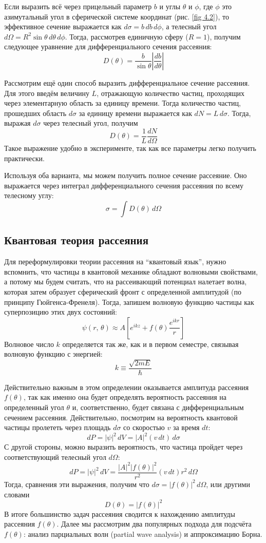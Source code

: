 Если выразить всё через прицельный параметр $b$ и углы $\theta$ и $\phi$, где
$\phi$ это азимутальный угол в сферической системе координат (рис. \ref{fig
  4.2}), то эффективное сечение выражается как $d\sigma = b\,db\,d\phi$, а
телесный угол $d\Omega = R^2\sin\theta\,d\theta\,d\phi$. Тогда, рассмотрев
единичную сферу ($R=1$), получим следующее уравнение для дифференциального
сечения рассеяния:
\[
  D(\theta) = \frac{b}{\sin \theta}\left|\frac{db}{d\theta}\right|
\]

Рассмотрим ещё один способ выразить дифференциальное сечение рассеяния. Для
этого введём величину $L$, отражающую количество частиц, проходящих через
элементарную область за единицу времени. Тогда количество частиц, прошедших
область $d\sigma$ за единицу времени выражается как $dN=L\,d\sigma$. Тогда,
выражая $d\sigma$ через телесный угол, получим
\[
  D(\theta) = \frac{1}{L}\frac{dN}{d\Omega}
\]
Такое выражение удобно в эксперименте, так как все параметры легко получить
практически.

Используя оба варианта, мы можем получить полное сечение рассеяние. Оно
выражается через интеграл дифференциального сечения рассеяния по всему
телесному углу:
\[
  \sigma = \int D(\theta)\,d\Omega
\]

\subsection{Квантовая теория рассеяния}
Для переформулировки теории рассеяния на ``квантовый язык'', нужно вспомнить,
что частицы в квантовой механике обладают волновыми свойствами, а потому мы
будем считать, что на рассеивающий потенциал налетает волна, которая затем
образует сферический фронт с определенной амплитудой (по принципу
Гюйгенса-Френеля). Тогда, запишем волновую функцию частицы как суперпозицию
этих двух состояний:
\[
  \psi(r,\,\theta)\approx A\left[e^{ikz} + f(\theta)\frac{e^{ikr}}{r}\right]
\]
Волновое число $k$ определяется так же, как и в первом семестре, связывая
волновую функцию с энергией:
\[
  k \equiv \frac{\sqrt{2mE}}{\hbar}
\]

Действительно важным в этом определении оказывается амплитуда рассеяния
$f(\theta)$, так как именно она будет определять вероятность рассеяния на
определенный угол $\theta$ и, соответственно, будет связана с дифференциальным
сечением рассеяния. Действительно, посмотрим на вероятность квантовой частицы
пролететь через площадь $d\sigma$ со скоростью $v$ за время $dt$:
\[
  dP = |\psi|^2\, dV = |A|^2(v\, dt)\,d\sigma
\]
С другой стороны, можно выразить вероятность, что частица пройдет через
соответствующий телесный угол $d\Omega$:
\[
  dP = |\psi|^2\,dV = \frac{|A|^2|f(\theta)|^2}{r^2}(v\,dt)r^2\,d\Omega
\]
Тогда, сравнения эти выражения, получим что $d\sigma = |f(\theta)|^2\,d\Omega$,
или другими словами
\[
  D(\theta) = |f(\theta)|^2
\]
В итоге большинство задач рассеяния сводится к нахождению амплитуды рассеяния
$f(\theta)$. Далее мы рассмотрим два популярных подхода для подсчёта
$f(\theta)$: анализ парциальных волн (partial wave analysis) и аппроксимацию
Борна.
